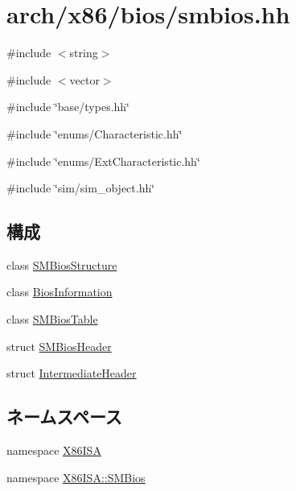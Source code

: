 \hypertarget{smbios_8hh}{
\section{arch/x86/bios/smbios.hh}
\label{smbios_8hh}
}
{\ttfamily \#include $<$string$>$}\par
{\ttfamily \#include $<$vector$>$}\par
{\ttfamily \#include \char`\"{}base/types.hh\char`\"{}}\par
{\ttfamily \#include \char`\"{}enums/Characteristic.hh\char`\"{}}\par
{\ttfamily \#include \char`\"{}enums/ExtCharacteristic.hh\char`\"{}}\par
{\ttfamily \#include \char`\"{}sim/sim\_\-object.hh\char`\"{}}\par
\subsection*{構成}
\begin{DoxyCompactItemize}
\item 
class \hyperlink{classX86ISA_1_1SMBios_1_1SMBiosStructure}{SMBiosStructure}
\item 
class \hyperlink{classX86ISA_1_1SMBios_1_1BiosInformation}{BiosInformation}
\item 
class \hyperlink{classX86ISA_1_1SMBios_1_1SMBiosTable}{SMBiosTable}
\item 
struct \hyperlink{structX86ISA_1_1SMBios_1_1SMBiosTable_1_1SMBiosHeader}{SMBiosHeader}
\item 
struct \hyperlink{structX86ISA_1_1SMBios_1_1SMBiosTable_1_1SMBiosHeader_1_1IntermediateHeader}{IntermediateHeader}
\end{DoxyCompactItemize}
\subsection*{ネームスペース}
\begin{DoxyCompactItemize}
\item 
namespace \hyperlink{namespaceX86ISA}{X86ISA}
\item 
namespace \hyperlink{namespaceX86ISA_1_1SMBios}{X86ISA::SMBios}
\end{DoxyCompactItemize}
